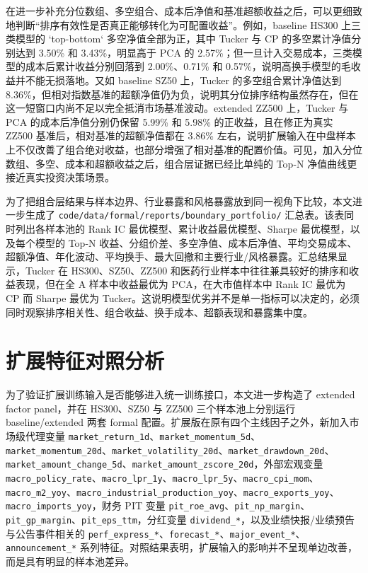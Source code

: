 在进一步补充分位数组、多空组合、成本后净值和基准超额收益之后，可以更细致地判断“排序有效性是否真正能够转化为可配置收益”。例如，baseline HS300 上三类模型的 `top-bottom` 多空净值全部为正，其中 Tucker 与 CP 的多空累计净值分别达到 3.50\% 和 3.43\%，明显高于 PCA 的 2.57\%；但一旦计入交易成本，三类模型的成本后累计收益分别回落到 2.00\%、0.71\% 和 0.57\%，说明高换手模型的毛收益并不能无损落地。又如 baseline SZ50 上，Tucker 的多空组合累计净值达到 8.36\%，但相对指数基准的超额净值仍为负，说明其分位排序结构虽然存在，但在这一短窗口内尚不足以完全抵消市场基准波动。extended ZZ500 上，Tucker 与 PCA 的成本后净值分别仍保留 5.99\% 和 5.98\% 的正收益，且在修正为真实 ZZ500 基准后，相对基准的超额净值都在 3.86\% 左右，说明扩展输入在中盘样本上不仅改善了组合绝对收益，也部分增强了相对基准的配置价值。可见，加入分位数组、多空、成本和超额收益之后，组合层证据已经比单纯的 Top-N 净值曲线更接近真实投资决策场景。

为了把组合层结果与样本边界、行业暴露和风格暴露放到同一视角下比较，本文进一步生成了 \texttt{code/data/formal/reports/boundary\_portfolio/} 汇总表。该表同时列出各样本池的 Rank IC 最优模型、累计收益最优模型、Sharpe 最优模型，以及每个模型的 Top-N 收益、分组价差、多空净值、成本后净值、平均交易成本、超额净值、年化波动、平均换手、最大回撤和主要行业/风格暴露。汇总结果显示，Tucker 在 HS300、SZ50、ZZ500 和医药行业样本中往往兼具较好的排序和收益表现，但在全 A 样本中收益最优为 PCA，在大市值样本中 Rank IC 最优为 CP 而 Sharpe 最优为 Tucker。这说明模型优劣并不是单一指标可以决定的，必须同时观察排序相关性、组合收益、换手成本、超额表现和暴露集中度。

\section{扩展特征对照分析}

为了验证扩展训练输入是否能够进入统一训练接口，本文进一步构造了 extended factor panel，并在 HS300、SZ50 与 ZZ500 三个样本池上分别运行 baseline/extended 两套 formal 配置。扩展版在原有四个主线因子之外，新加入市场级代理变量 \texttt{market\_return\_1d}、\texttt{market\_momentum\_5d}、\texttt{market\_momentum\_20d}、\texttt{market\_volatility\_20d}、\texttt{market\_drawdown\_20d}、\texttt{market\_amount\_change\_5d}、\texttt{market\_amount\_zscore\_20d}，外部宏观变量 \texttt{macro\_policy\_rate}、\texttt{macro\_lpr\_1y}、\texttt{macro\_lpr\_5y}、\texttt{macro\_cpi\_mom}、\texttt{macro\_m2\_yoy}、\texttt{macro\_industrial\_production\_yoy}、\texttt{macro\_exports\_yoy}、\texttt{macro\_imports\_yoy}，财务 PIT 变量 \texttt{pit\_roe\_avg}、\texttt{pit\_np\_margin}、\texttt{pit\_gp\_margin}、\texttt{pit\_eps\_ttm}，分红变量 \texttt{dividend\_*}，以及业绩快报/业绩预告与公告事件相关的 \texttt{perf\_express\_*}、\texttt{forecast\_*}、\texttt{major\_event\_*}、\texttt{announcement\_*} 系列特征。对照结果表明，扩展输入的影响并不呈现单边改善，而是具有明显的样本池差异。

